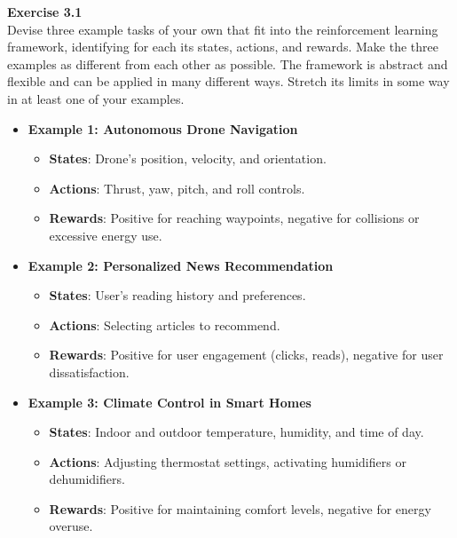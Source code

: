 \documentclass[addpoints]{exam}
\begin{document}
\begin{questions}
    \question
    \textbf{Exercise 3.1} \\ Devise three example tasks of your own that fit into the reinforcement learning framework, identifying for each its states, actions, and rewards. Make the three examples as different from each other as possible. The framework is abstract and flexible and can be applied in many different ways. Stretch its limits in some way in at least one of your examples.
    \begin{solution}
        \begin{itemize}
            \item \textbf{Example 1: Autonomous Drone Navigation}
            \begin{itemize}
                \item \textbf{States}: Drone's position, velocity, and orientation.
                \item \textbf{Actions}: Thrust, yaw, pitch, and roll controls.
                \item \textbf{Rewards}: Positive for reaching waypoints, negative for collisions or excessive energy use.
            \end{itemize}
            \item \textbf{Example 2: Personalized News Recommendation}
            \begin{itemize}
                \item \textbf{States}: User's reading history and preferences.
                \item \textbf{Actions}: Selecting articles to recommend.
                \item \textbf{Rewards}: Positive for user engagement (clicks, reads), negative for user dissatisfaction.
            \end{itemize}
            \item \textbf{Example 3: Climate Control in Smart Homes}
            \begin{itemize}
                \item \textbf{States}: Indoor and outdoor temperature, humidity, and time of day.
                \item \textbf{Actions}: Adjusting thermostat settings, activating humidifiers or dehumidifiers.
                \item \textbf{Rewards}: Positive for maintaining comfort levels, negative for energy overuse.
            \end{itemize}
        \end{itemize}
    \end{solution}


\end{questions}
\end{document}
